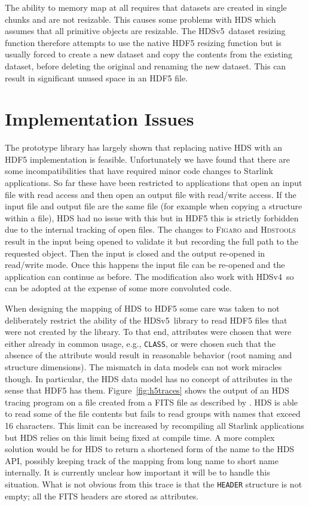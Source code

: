 \documentclass[final,authoryear,5p,times,twocolumn]{elsarticle}
\newcommand{\new}{HDSv5}
\newcommand{\old}{HDSv4}
\begin{document}
The ability to memory map at all requires that datasets are created in
single chunks and are not resizable. This causes some problems with
HDS which assumes that all primitive objects are resizable. The \new\
dataset resizing function therefore attempts to use the native
HDF5 resizing function but is usually forced to create a new dataset
and copy the contents from the existing dataset, before deleting the
original and renaming the new dataset. This can result in significant
unused space in an HDF5 file.

\section{Implementation Issues}

The prototype library has largely shown that replacing native HDS with
an HDF5 implementation is feasible. Unfortunately we have found that
there are some incompatibilities that have required minor code changes
to Starlink applications. So far these have been restricted to
applications that open an input file with read access and then open an
output file with read/write access. If the input file and output file
are the same file (for example when copying a structure within a
file), HDS had no issue with this but in HDF5 this is strictly
forbidden due to the internal tracking of open files. The changes to
\textsc{Figaro} \citep[][\ascl{1411.022}]{1993ASPC...52..219S} and
\textsc{Hdstools} \citep{SUN245} result in the input being opened to
validate it but recording the full path to the requested object. Then
the input is closed and the output re-opened in read/write mode. Once
this happens the input file can be re-opened and the application can
continue as before. The modification also work with \old\ so can be
adopted at the expense of some more convoluted code.

When designing the mapping of HDS to HDF5 some care was taken to not
deliberately restrict the ability of the \new\ library to read HDF5
files that were not created by the library. To that end, attributes
were chosen that were either already in common usage, e.g.,
\texttt{CLASS}, or were chosen such that the absence of the attribute
would result in reasonable behavior (root naming and structure
dimensions). The mismatch in data models can not work miracles
though. In particular, the HDS data model has no concept of attributes
in the sense that HDF5 has them. Figure~\ref{fig:h5traces} shows the
output of an HDS tracing program on a file created from a FITS file
as described by \citet{O4-4_adassxxiv}. HDS is able to read some of
the file contents but fails to read groups with names that exceed 16
characters. This limit can be increased by recompiling all Starlink
applications but HDS relies on this limit being fixed at compile time.
A more complex solution would be for HDS to return a shortened form of
the name to the HDS API, possibly keeping track of the mapping from
long name to short name internally. It is currently unclear how
important it will be to handle this situation. What is not obvious
from this trace is that the \texttt{HEADER} structure is not empty;
all the FITS headers are stored as attributes.
\end{document}

